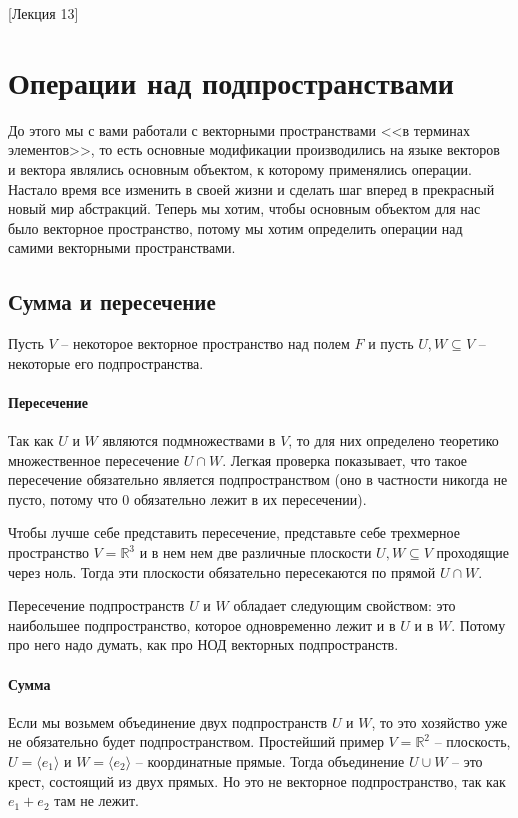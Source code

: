 [Лекция 13]

\newpage
\section{Операции над подпространствами}

До этого мы с вами работали с векторными пространствами <<в терминах элементов>>, то есть основные модификации производились на языке векторов и вектора являлись основным объектом, к которому применялись операции. Настало время все изменить в своей жизни и сделать шаг вперед в прекрасный новый мир абстракций. Теперь мы хотим, чтобы основным объектом для нас было векторное пространство, потому мы хотим определить операции над самими векторными пространствами.

\subsection{Сумма и пересечение}

Пусть $V$ -- некоторое векторное пространство над полем $F$ и пусть $U, W \subseteq V$ -- некоторые его подпространства.

\paragraph{Пересечение} Так как $U$ и $W$ являются подмножествами в $V$, то для них определено теоретико множественное пересечение $U\cap W$. Легкая проверка показывает, что такое пересечение обязательно является подпространством (оно в частности никогда не пусто, потому что $0$ обязательно лежит в их пересечении). 

Чтобы лучше себе представить пересечение, представьте себе трехмерное пространство $V = \mathbb R^3$ и в нем нем две различные плоскости $U,W\subseteq V$ проходящие через ноль. Тогда эти плоскости обязательно пересекаются по прямой $U\cap W$.

Пересечение подпространств $U$ и $W$ обладает следующим свойством: это наибольшее подпространство, которое одновременно лежит и в $U$ и в $W$. Потому про него надо думать, как про НОД векторных подпространств.

\paragraph{Сумма} Если мы возьмем объединение двух подпространств $U$ и $W$, то это хозяйство уже не обязательно будет подпространством. Простейший пример $V = \mathbb R^2$ -- плоскость, $U = \langle e_1\rangle$ и $W = \langle e_2 \rangle$ -- координатные прямые. Тогда объединение $U\cup W$ -- это крест, состоящий из двух прямых. Но это не векторное подпространство, так как $e_1 + e_2$ там не лежит.

